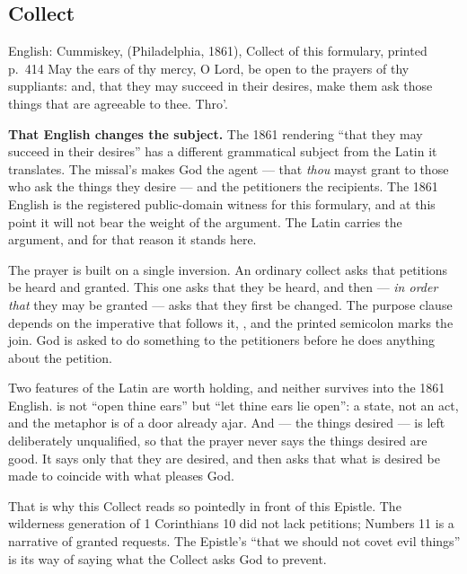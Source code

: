 \elementguard
\subsection*{Collect }


\begin{namedtranslation}{English: Cummiskey,  (Philadelphia, 1861), Collect of this formulary, printed p.~414}
May the ears of thy mercy, O Lord, be open to the prayers of thy suppliants:
and, that they may succeed in their desires, make them ask those things that
are agreeable to thee. Thro'.
\end{namedtranslation}

\textbf{That English changes the subject.} The 1861 rendering ``that they may succeed in their desires'' has a different
grammatical subject from the Latin it translates. The missal's
 makes God the agent --- that
\textit{thou} mayst grant to those who ask the things they desire --- and the
petitioners the recipients. The 1861 English is the registered public-domain
witness for this formulary, and at this point it will not bear the weight of
the argument. The Latin carries the argument, and for that reason it stands
here.

The prayer is built on a single inversion. An ordinary collect asks that
petitions be heard and granted. This one asks that they be heard, and then ---
\textit{in order that} they may be granted --- asks that they first be
changed. The purpose clause  depends
on the imperative that follows it, , and the printed semicolon marks the join. God is asked to do
something to the petitioners before he does anything about the petition.

Two features of the Latin are worth holding, and neither survives into the
1861 English.  is not ``open thine ears'' but ``let thine ears lie
open'': a state, not an act, and the metaphor is of a door already ajar. And
 --- the things desired --- is left deliberately
unqualified, so that the prayer never says the things desired are good. It
says only that they are desired, and then asks that what is desired be made to
coincide with what pleases God.

That is why this Collect reads so pointedly in front of this Epistle. The wilderness
generation of 1 Corinthians 10 did not lack petitions; Numbers 11 is a
narrative of granted requests. The Epistle's ``that we should not covet evil
things'' is its way of saying what the Collect asks God to prevent.


